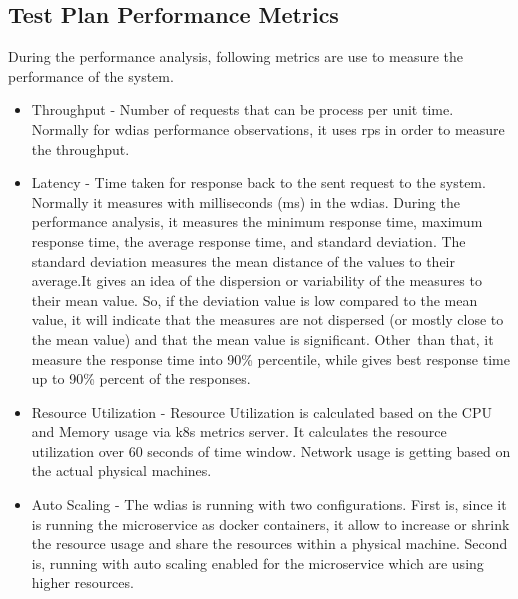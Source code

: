 \subsection{Test Plan Performance Metrics}
\label{subse:test_plan_metrics}
During the performance analysis, following metrics are use to measure the performance of the system.
\begin{itemize}
    \item Throughput - Number of requests that can be process per unit time. Normally for \acrshort{wdias} performance observations, it uses \acrfull{rps} in order to measure the throughput.
    \item Latency - Time taken for response back to the sent request to the system. Normally it measures with milliseconds (ms) in the \acrshort{wdias}. During the performance analysis, it measures the minimum response time, maximum response time, the average response time, and standard deviation. The standard deviation measures the mean distance of the values to their average.It gives an idea of the dispersion or variability of the measures to their mean value. So, if the deviation value is low compared to the mean value, it will indicate that the measures are not dispersed (or mostly close to the mean value) and that the mean value is significant. Other than that, it measure the response time into 90\% percentile, while gives best response time up to 90\% percent of the responses.
    \item Resource Utilization - Resource Utilization is calculated based on the CPU and Memory usage via \acrshort{k8s} metrics server. It calculates the resource utilization over 60 seconds of time window. Network usage is getting based on the actual physical machines.
    \item Auto Scaling - The \acrshort{wdias} is running with two configurations. First is, since it is running the microservice as docker containers, it allow to increase or shrink the resource usage and share the resources within a physical machine. Second is, running with auto scaling enabled for the microservice which are using higher resources.
\end{itemize}
